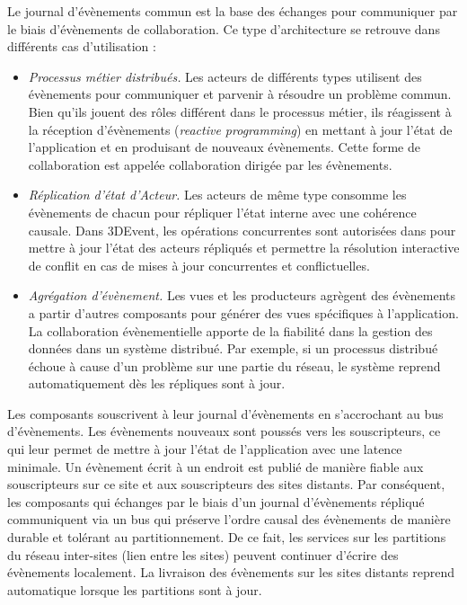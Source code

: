 Le journal d'évènements commun est la base des échanges pour communiquer 
par le biais d'évènements de collaboration. Ce type d'architecture se retrouve dans 
différents cas d'utilisation :
\begin{itemize}
	\item \textit{Processus métier distribués.} Les acteurs de différents types 
	utilisent des évènements pour communiquer et parvenir à résoudre un problème 
	commun. Bien qu'ils jouent des rôles différent dans le processus métier, ils 
	réagissent à la réception d'évènements (\textit{reactive programming}) en 
	mettant à jour l'état de l'application et en produisant de nouveaux évènements. 
	Cette forme de collaboration est appelée collaboration dirigée par les 
	évènements.
	\item\textit{Réplication d'état d'Acteur.} Les acteurs de même type consomme 
	les évènements de chacun pour répliquer l'état interne avec une cohérence 
	causale. Dans 3DEvent, les opérations concurrentes sont autorisées dans pour 
	mettre à jour l'état des acteurs répliqués et permettre la résolution interactive de 
	conflit en cas de mises à jour concurrentes et conflictuelles. 
	\item \textit{Agrégation d'évènement.} Les vues et les producteurs agrègent des 
	évènements a partir d'autres composants pour générer des vues spécifiques à 
	l'application.
	La collaboration évènementielle apporte de la fiabilité dans la gestion des 
	données dans un système distribué. Par exemple, si un processus distribué 
	échoue à cause d'un problème sur une partie du réseau, le système reprend 
	automatiquement dès les répliques sont à jour.
\end{itemize}

Les composants souscrivent à leur journal d'évènements en s'accrochant au bus 
d'évènements. 
Les évènements nouveaux sont poussés vers les souscripteurs, 
ce qui leur permet de mettre à jour l'état de l'application avec une latence 
minimale. 
Un évènement écrit à un endroit est publié de manière fiable aux souscripteurs sur 
ce site et aux souscripteurs des sites distants. 
Par conséquent, les composants qui échanges par le biais d'un 
journal d'évènements répliqué communiquent via un bus qui préserve l'ordre causal 
des évènements de manière durable et tolérant au partitionnement. De ce fait, les 
services sur les partitions du réseau inter-sites (lien entre les sites) peuvent 
continuer d'écrire des évènements localement. La livraison des évènements sur 
les sites distants reprend automatique lorsque les partitions sont à jour.


